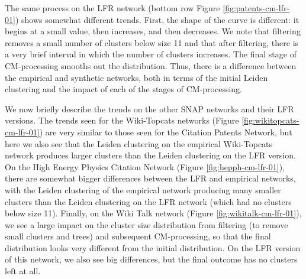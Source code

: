 \documentclass[11pt]{article}   	%
\begin{document}
The same process on the LFR network (bottom row Figure \ref{fig:patents-cm-lfr-01}) shows  somewhat different trends.
First, the shape of the curve is different: it begins at a small value, then increases, and then decreases.
We note that filtering removes a small number of clusters below size 11 and that
after filtering, there is a very brief interval in which the number of clusters increases.
The final stage of CM-processing smooths out the distribution.
Thus, there is a difference between the empirical and synthetic networks, both in terms of the initial Leiden clustering and the impact of each of
the stages of CM-processing.

We now briefly describe the trends on the other SNAP networks and their LFR versions.
The trends seen for the Wiki-Topcats networks  (Figure \ref{fig:wikitopcats-cm-lfr-01}) are very similar to those seen for the Citation Patents
Network, but here we also see that the Leiden clustering on the empirical Wiki-Topcats network produces larger clusters than the Leiden clustering on the LFR version.
On the High Energy Physics Citation Network (Figure \ref{fig:hepph-cm-lfr-01}), there are somewhat bigger differences between the LFR and empirical networks, with the Leiden clustering of the empirical network producing many smaller clusters than the Leiden clustering on the LFR network (which had no clusters below size 11).
Finally, on the Wiki Talk network (Figure \ref{fig:wikitalk-cm-lfr-01}), we see a large impact on the cluster size distribution from filtering (to remove small clusters and trees) and subsequent CM-processing, so that the final distribution looks very different from the initial distribution.
On the LFR version of this network, we also see big differences, but the final outcome has no clusters left at all.
\end{document}
